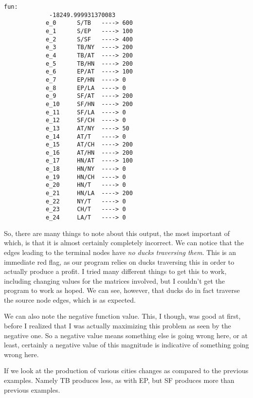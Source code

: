\documentclass[11pt]{article}
\begin{document}
    \begin{minipage}[t]{.42\linewidth}
        \begin{lstlisting}[basicstyle=\small, gobble=12]
            fun:
             -18249.999931370083
            e_0  	 S/TB 	----> 600
            e_1  	 S/EP 	----> 100
            e_2  	 S/SF 	----> 400
            e_3  	 TB/NY 	----> 200
            e_4  	 TB/AT 	----> 200
            e_5  	 TB/HN 	----> 200
            e_6  	 EP/AT 	----> 100
            e_7  	 EP/HN 	----> 0
            e_8  	 EP/LA 	----> 0
            e_9  	 SF/AT 	----> 200
            e_10  	 SF/HN 	----> 200
            e_11  	 SF/LA 	----> 0
            e_12  	 SF/CH 	----> 0
            e_13  	 AT/NY 	----> 50
            e_14  	 AT/T 	----> 0
            e_15  	 AT/CH 	----> 200
            e_16  	 AT/HN 	----> 200
            e_17  	 HN/AT 	----> 100
            e_18  	 HN/NY 	----> 0
            e_19  	 HN/CH 	----> 0
            e_20  	 HN/T 	----> 0
            e_21  	 HN/LA 	----> 200
            e_22  	 NY/T 	----> 0
            e_23  	 CH/T 	----> 0
            e_24  	 LA/T 	----> 0
        \end{lstlisting}
    \end{minipage} \hfill \vline \hfill %
    \begin{minipage}[t]{.42\linewidth}
        So, there are many things to note about this output, the most important
        of which, is that it is almost certainly completely incorrect. We can
        notice that the edges leading to the terminal nodes have \textit{no
        ducks traversing them}. This is an immediate red flag, as our program
        relies on ducks traversing this in order to actually produce a profit.
        I tried many different things to get this to work, including changing
        values for the matrices involved, but I couldn't get the program to
        work as hoped. We can see, however, that ducks do in fact traverse the
        source node edges, which is as expected. 

        \medskip

        We can also note the negative function value. This, I though, was good
        at first, before I realized that I was actually maximizing this problem
        as seen by the negative one. So a negative value means something else
        is going wrong here, or at least, certainly a negative value of this
        magnitude is indicative of something going wrong here.
    \end{minipage}

    If we look at the production of various cities changes as compared to the
    previous examples. Namely TB produces less, as with EP, but SF produces
    more than previous examples.
\end{document}
